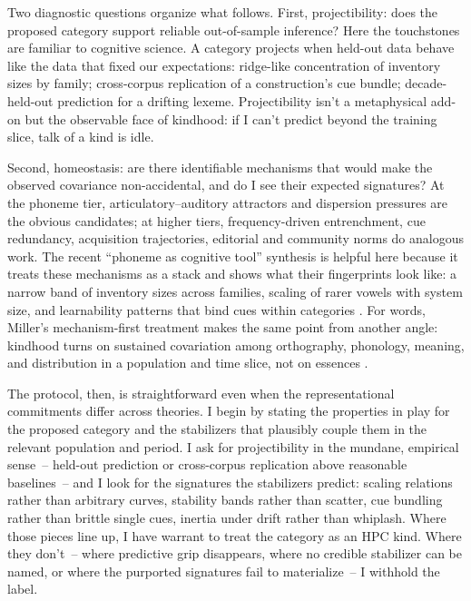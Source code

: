 \documentclass[12pt]{article}
\begin{document}
Two diagnostic questions organize what follows. First, projectibility: does the proposed category support reliable out-of-sample inference? Here the touchstones are familiar to cognitive science. A category projects when held-out data behave like the data that fixed our expectations: ridge-like concentration of inventory sizes by family; cross-corpus replication of a construction’s cue bundle; decade-held-out prediction for a drifting lexeme. Projectibility isn't a metaphysical add-on but the observable face of kindhood: if I can't predict beyond the training slice, talk of a kind is idle.

Second, homeostasis: are there identifiable mechanisms that would make the observed covariance non-accidental, and do I see their expected signatures? At the phoneme tier, articulatory–auditory attractors and dispersion pressures are the obvious candidates; at higher tiers, frequency-driven entrenchment, cue redundancy, acquisition trajectories, editorial and community norms do analogous work. The recent “phoneme as cognitive tool” synthesis is helpful here because it treats these mechanisms as a stack and shows what their fingerprints look like: a narrow band of inventory sizes across families, scaling of rarer vowels with system size, and learnability patterns that bind cues within categories \citep[Fig.\,1; Fig.\,2; Table~1]{Ekstrom2025PhonemeTool}. For words, Miller’s mechanism-first treatment makes the same point from another angle: kindhood turns on sustained covariation among orthography, phonology, meaning, and distribution in a population and time slice, not on essences \citep{Miller2021WordsSpeciesKinds}.

The protocol, then, is straightforward even when the representational commitments differ across theories. I begin by stating the properties in play for the proposed category and the stabilizers that plausibly couple them in the relevant population and period. I ask for projectibility in the mundane, empirical sense~-- held-out prediction or cross-corpus replication above reasonable baselines~-- and I look for the signatures the stabilizers predict: scaling relations rather than arbitrary curves, stability bands rather than scatter, cue bundling rather than brittle single cues, inertia under drift rather than whiplash. Where those pieces line up, I have warrant to treat the category as an \textsc{HPC} kind. Where they don't~-- where predictive grip disappears, where no credible stabilizer can be named, or where the purported signatures fail to materialize~-- I withhold the label.
\end{document}

